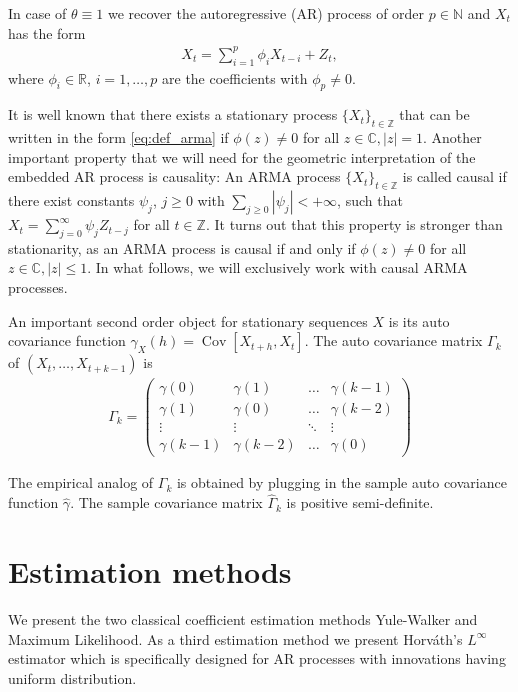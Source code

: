 In case of $\theta\equiv1$ we recover the autoregressive (AR) process of order $p\in\mathbb{N}$ and $X_t$ has the form
\begin{align}\label{eq:ar(p)}
    X_t=\sum_{i=1}^{p}\phi_iX_{t-i}+Z_t,
\end{align}
where $\phi_i\in\mathbb{R}$, $i=1,\dots,p$ are the coefficients with $\phi_p\ne0$.

It is well known that there exists a stationary process $\{X_t\}_{t\in\mathbb{Z}}$ that can be written in the form \eqref{eq:def_arma} if $\phi(z)\neq0$ for all $z\in\mathbb{C},\lvert z\rvert=1$. Another important property that we will need for the geometric interpretation of the embedded AR process is causality: An ARMA process $\{X_t\}_{t\in\mathbb{Z}}$ is called causal if there exist constants $\psi_j$, $j\ge0$ with $\sum_{j\ge0}|\psi_j|<+\infty$, such that $X_t=\sum_{j=0}^{\infty}\psi_jZ_{t-j}$ for all $t\in\mathbb{Z}$. It turns out that this property is stronger than stationarity, as an ARMA process is causal if and only if $\phi(z)\neq0$ for all $z\in\mathbb{C},\lvert z\rvert\le1$. In what follows, we will exclusively work with causal ARMA processes.

An important second order object for stationary sequences $X$ is its auto covariance function $\gamma_X(h)=\operatorname{Cov}[X_{t+h},X_t]$. The auto covariance matrix $\Gamma_k$ of $(X_t,\dots,X_{t+k-1})$ is
\begin{align*}
    \Gamma_k=\begin{pmatrix}
        \gamma(0) & \gamma(1) & \dots & \gamma(k-1)\\
        \gamma(1) & \gamma(0) & \dots & \gamma(k-2)\\
        \vdots & \vdots & \ddots & \vdots\\
        \gamma(k-1) & \gamma(k-2) & \dots & \gamma(0)
    \end{pmatrix}
\end{align*}

The empirical analog of $\Gamma_k$ is obtained by plugging in the sample auto covariance function $\hat{\gamma}$. The sample covariance matrix $\hat{\Gamma}_k$ is positive semi-definite.


\section{Estimation methods}\label{sec:classical_estimation_methods}

We present the two classical coefficient estimation methods Yule-Walker and Maximum Likelihood. As a third estimation method we present Horváth's $L^{\infty}$ estimator which is specifically designed for AR processes with innovations having uniform distribution.

